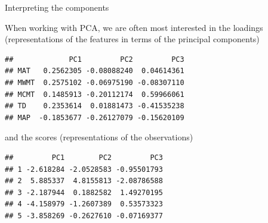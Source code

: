 \documentclass[
  ignorenonframetext,
]{beamer}
\newenvironment{Shaded}{\begin{snugshade}}{\end{snugshade}}
\newcommand{\DecValTok}[1]{\textcolor[rgb]{0.00,0.00,0.81}{#1}}
\newcommand{\KeywordTok}[1]{\textcolor[rgb]{0.13,0.29,0.53}{\textbf{#1}}}
\newcommand{\NormalTok}[1]{#1}
\newcommand{\OperatorTok}[1]{\textcolor[rgb]{0.81,0.36,0.00}{\textbf{#1}}}
\newcommand{\StringTok}[1]{\textcolor[rgb]{0.31,0.60,0.02}{#1}}
\begin{document}
\begin{frame}[fragile]{Interpreting the components}
\protect\hypertarget{interpreting-the-components}{}

When working with PCA, we are often most interested in the loadings
(representations of the features in terms of the principal components)
\scriptsize

\begin{Shaded}
\end{Shaded}

\begin{verbatim}
##             PC1         PC2         PC3
## MAT   0.2562305 -0.08088240  0.04614361
## MWMT  0.2575102 -0.06975190 -0.08307110
## MCMT  0.1485913 -0.20112174  0.59966061
## TD    0.2353614  0.01881473 -0.41535238
## MAP  -0.1853677 -0.26127079 -0.15620109
\end{verbatim}

\normalsize

and the scores (representations of the observations) \scriptsize

\begin{Shaded}
\end{Shaded}

\begin{verbatim}
##         PC1        PC2         PC3
## 1 -2.618284 -2.0528583 -0.95501793
## 2  5.885337  4.8155813 -2.08786588
## 3 -2.187944  0.1882582  1.49270195
## 4 -4.158979 -1.2607389  0.53573323
## 5 -3.858269 -0.2627610 -0.07169377
\end{verbatim}

\end{frame}
\end{document}
